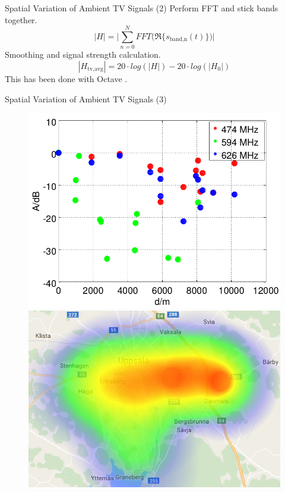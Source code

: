 \documentclass[apectratio=169]{beamer}
\begin{document}
\begin{frame}{Spatial Variation of Ambient TV Signals (2)}
	Perform FFT and stick bands together.
	\begin{equation}
		|H| = \Biggl| \sum_{n=0}^N FFT\biggl( \Re\{ s_{\text{band,n}}(t) \} \biggr) \Biggr|
	\end{equation}
	Smoothing and signal strength calculation. 
	\begin{equation}
		|H_{\text{tv,avg}}| = 20 \cdot log (|H|) - 20 \cdot log(|H_0|)
	\end{equation}
	This has been done with Octave \cite{s3xm3x_RTLSDRSpecAn}.
\end{frame}

\begin{frame}{Spatial Variation of Ambient TV Signals (3)}
\begin{figure}[h]
	\centering
	\begin{minipage}{0.49\columnwidth}
		\includegraphics[width=\columnwidth]{./fig/haversine}
	\end{minipage}
	\hfill
	\begin{minipage}{0.49\columnwidth}
		\includegraphics[width=\columnwidth]{./fig/heatmap_626mhz}

\end{minipage}
\end{figure}
\end{frame}
\end{document}
